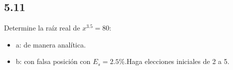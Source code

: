 \documentclass[12pt,oneside,FLEQN]{report}
\begin{document}
{\begin{figure}[!h]
		\end{figure}
		\subsection{5.11}
		Determine la raíz real de $x^3.5=80$:
		\begin{itemize}
			\item a: de manera analítica.
			\item b: con falsa posición con $E_{s}=2.5\%$.Haga elecciones iniciales de 2 a 5.
		\end{itemize}
			
}
\end{document}
